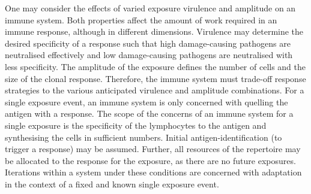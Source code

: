 One may consider the effects of varied exposure virulence and amplitude on an immune system. Both properties affect the amount of work required in an immune response, although in different dimensions. Virulence may determine the desired specificity of a response such that high damage-causing pathogens are neutralised effectively and low damage-causing pathogens are neutralised with less specificity. The amplitude of the exposure defines the number of cells and the size of the clonal response. Therefore, the immune system must trade-off response strategies to the various anticipated virulence and amplitude combinations.
For a single exposure event, an immune system is only concerned with quelling the antigen with a response. The scope of the concerns of an immune system for a single exposure is the specificity of the lymphocytes to the antigen and synthesising the cells in sufficient numbers. Initial antigen-identification (to trigger a response) may be assumed. Further, all resources of the repertoire may be allocated to the response for the exposure, as there are no future exposures. Iterations within a system under these conditions are concerned with adaptation in the context of a fixed and known single exposure event.

%
%
